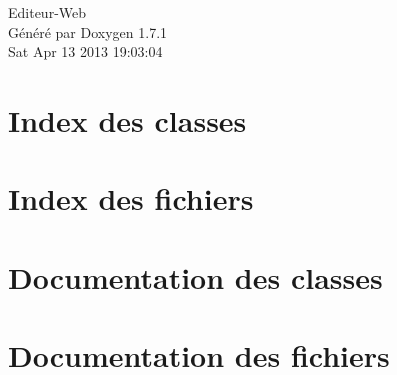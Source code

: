 \documentclass[a4paper]{book}
\begin{document}
\hypersetup{pageanchor=false}
\begin{titlepage}
\vspace*{7cm}
\begin{center}
{\Large Editeur-\/Web }\\
\vspace*{1cm}
{\large Généré par Doxygen 1.7.1}\\
\vspace*{0.5cm}
{\small Sat Apr 13 2013 19:03:04}\\
\end{center}
\end{titlepage}
\clearemptydoublepage
{}
\tableofcontents
\clearemptydoublepage
{}
\hypersetup{pageanchor=true}
\chapter{Index des classes}

\chapter{Index des fichiers}

\chapter{Documentation des classes}








\chapter{Documentation des fichiers}




\printindex
\end{document}
